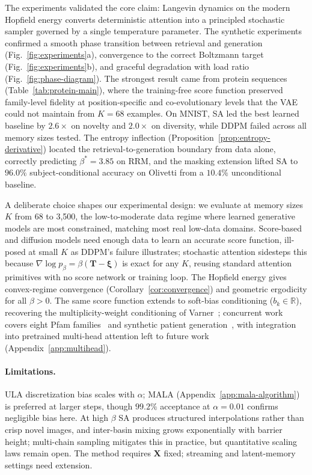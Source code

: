 
The experiments validated the core claim: Langevin dynamics on the modern Hopfield energy converts deterministic attention into a principled stochastic sampler governed by a single temperature parameter. The synthetic experiments confirmed a smooth phase transition between retrieval and generation (Fig.~\ref{fig:experiments}a), convergence to the correct Boltzmann target (Fig.~\ref{fig:experiments}b), and graceful degradation with load ratio (Fig.~\ref{fig:phase-diagram}). The strongest result came from protein sequences (Table~\ref{tab:protein-main}), where the training-free score function preserved family-level fidelity at position-specific and co-evolutionary levels that the VAE could not maintain from $K{=}68$ examples. On MNIST, SA led the best learned baseline by $2.6{\times}$ on novelty and $2.0{\times}$ on diversity, while DDPM failed across all memory sizes tested. The entropy inflection (Proposition~\ref{prop:entropy-derivative}) located the retrieval-to-generation boundary from data alone, correctly predicting $\beta^*{=}3.85$ on RRM, and the masking extension lifted SA to $96.0\%$ subject-conditional accuracy on Olivetti from a $10.4\%$ unconditional baseline.

A deliberate choice shapes our experimental design: we evaluate at memory sizes $K$ from 68 to 3{,}500, the low-to-moderate data regime where learned generative models are most constrained, matching most real low-data domains. Score-based and diffusion models need enough data to learn an accurate score function, ill-posed at small $K$ as DDPM's failure illustrates; stochastic attention sidesteps this because $\nabla\log p_\beta = \beta(\mathbf{T}-\boldsymbol{\xi})$ is exact for any $K$, reusing standard attention primitives with no score network or training loop. The Hopfield energy gives convex-regime convergence (Corollary~\ref{cor:convergence}) and geometric ergodicity for all $\beta>0$. The same score function extends to soft-bias conditioning ($b_{k}\in\mathbb{R}$), recovering the multiplicity-weight conditioning of Varner~\cite{varnerConditioningProtein2026}; concurrent work covers eight Pfam families~\cite{varnerTrainingFreeProtein2026} and synthetic patient generation~\cite{varnerSyntheticPatient2026}, with integration into pretrained multi-head attention left to future work (Appendix~\ref{app:multihead}).

\paragraph{Limitations.}
ULA discretization bias scales with $\alpha$; MALA (Appendix~\ref{app:mala-algorithm}) is preferred at larger steps, though $99.2\%$ acceptance at $\alpha{=}0.01$ confirms negligible bias here. At high $\beta$ SA produces structured interpolations rather than crisp novel images, and inter-basin mixing grows exponentially with barrier height; multi-chain sampling mitigates this in practice, but quantitative scaling laws remain open. The method requires $\mathbf{X}$ fixed; streaming and latent-memory settings need extension.
